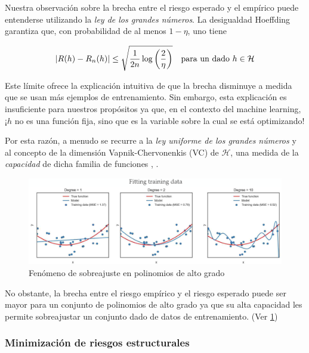 Nuestra observaci\'on sobre la brecha entre el riesgo esperado y el emp\'irico puede entenderse utilizando la \textit{ley de los grandes n\'umeros}. La desigualdad Hoeffding \cite{hoeffding:1962} garantiza que, con probabilidad de al menos $1 - \eta$, uno tiene

\begin{equation}
\left\lvert R(h) - R_n(h)\right\rvert \leq \sqrt{\frac{1}{2n} \log\left(\frac{2}{\eta}\right)} \quad \text{para un dado } h \in \mathcal{H}
\end{equation}

Este l\'imite ofrece la explicaci\'on intuitiva de que la brecha disminuye a medida que se usan m\'as ejemplos de entrenamiento. Sin embargo, esta explicaci\'on es insuficiente para nuestros prop\'ositos ya que, en el contexto del machine learning, ¡$h$ no es una funci\'on fija, sino que es la variable sobre la cual se est\'a optimizando!

Por esta raz\'on, a menudo se recurre a la \textit{ley uniforme de los grandes n\'umeros} y al concepto de la dimensi\'on Vapnik-Chervonenkis (VC) de $\mathcal{H} $, una medida de la \textit{capacidad} de dicha familia de funciones \cite{vapnik:1971}, \cite{mohri:2012}. 

\begin{figure}[h]
	\centering
	\includegraphics[scale=.3]{gfx/overfitting.png}
	\caption{Fen\'omeno de sobreajuste en polinomios de alto grado}
	\label{gfx: overfitting}
\end{figure}


No obstante, la brecha entre el riesgo emp\'irico y el riesgo esperado puede ser mayor para un conjunto de polinomios de alto grado ya que su alta capacidad les permite sobreajustar un conjunto dado de datos de entrenamiento. (Ver \ref{gfx: overfitting})

\subsubsection{Minimizaci\'on de riesgos estructurales}

